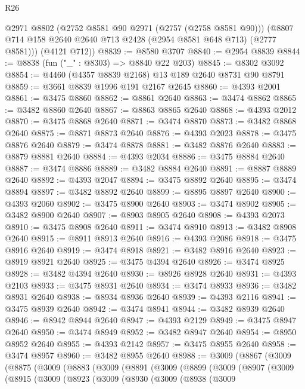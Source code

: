 \begin{lexlean}{R26}
\begin{coremodule}
        @2971
        @8802
        (@2752 @8581 @90 @2971 (@2757 (@2758 @8581 @90)))
        (@8807 @714 @158 @2640 @2640 @713 @2428 (@2954 @8581 @648 @713) (@2777 @8581)))
      (@4121 @712))
@8839 := @8580 @3707
@8840 := @2954 @8839
@8844 := @8838 (fun ("_" : @8303) => @8840 @22 @203)
@8845 := @8302 @3092
@8854 := @4460 (@4357 @8839 @2168) @13 @189 @2640 @8731 @90 @8791
@8859 := @3661 @8839 @1996 @191 @2167 @2645
@8860 := @4393 @2001
@8861 := @3475 @8860
@8862 := @8861 @2640
@8863 := @3474 @8862
@8865 := @3482 @8860 @2640
@8867 := @8863 @8865 @2640
@8868 := @4393 @2012
@8870 := @3475 @8868 @2640
@8871 := @3474 @8870
@8873 := @3482 @8868 @2640
@8875 := @8871 @8873 @2640
@8876 := @4393 @2023
@8878 := @3475 @8876 @2640
@8879 := @3474 @8878
@8881 := @3482 @8876 @2640
@8883 := @8879 @8881 @2640
@8884 := @4393 @2034
@8886 := @3475 @8884 @2640
@8887 := @3474 @8886
@8889 := @3482 @8884 @2640
@8891 := @8887 @8889 @2640
@8892 := @4393 @2047
@8894 := @3475 @8892 @2640
@8895 := @3474 @8894
@8897 := @3482 @8892 @2640
@8899 := @8895 @8897 @2640
@8900 := @4393 @2060
@8902 := @3475 @8900 @2640
@8903 := @3474 @8902
@8905 := @3482 @8900 @2640
@8907 := @8903 @8905 @2640
@8908 := @4393 @2073
@8910 := @3475 @8908 @2640
@8911 := @3474 @8910
@8913 := @3482 @8908 @2640
@8915 := @8911 @8913 @2640
@8916 := @4393 @2086
@8918 := @3475 @8916 @2640
@8919 := @3474 @8918
@8921 := @3482 @8916 @2640
@8923 := @8919 @8921 @2640
@8925 := @3475 @4394 @2640
@8926 := @3474 @8925
@8928 := @3482 @4394 @2640
@8930 := @8926 @8928 @2640
@8931 := @4393 @2103
@8933 := @3475 @8931 @2640
@8934 := @3474 @8933
@8936 := @3482 @8931 @2640
@8938 := @8934 @8936 @2640
@8939 := @4393 @2116
@8941 := @3475 @8939 @2640
@8942 := @3474 @8941
@8944 := @3482 @8939 @2640
@8946 := @8942 @8944 @2640
@8947 := @4393 @2129
@8949 := @3475 @8947 @2640
@8950 := @3474 @8949
@8952 := @3482 @8947 @2640
@8954 := @8950 @8952 @2640
@8955 := @4393 @2142
@8957 := @3475 @8955 @2640
@8958 := @3474 @8957
@8960 := @3482 @8955 @2640
@8988 := @3009
    (@8867
      (@3009
        (@8875
          (@3009
            (@8883
              (@3009
                (@8891
                  (@3009
                    (@8899
                      (@3009
                        (@8907
                          (@3009
                            (@8915
                              (@3009
                                (@8923
                                  (@3009
                                    (@8930
                                      (@3009
                                        (@8938
                                          (@3009

\end{coremodule}
\end{lexlean}

